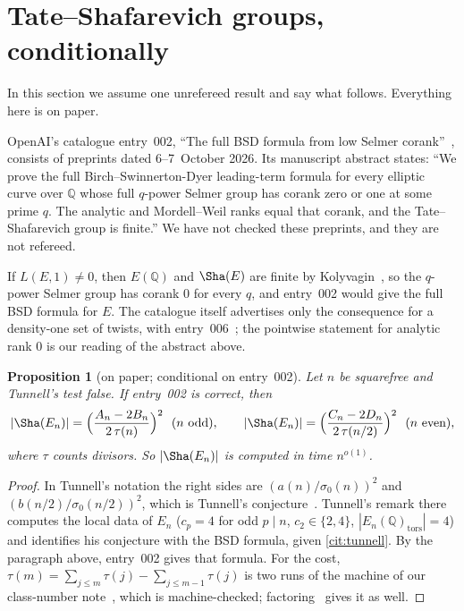 \documentclass[10pt]{amsart}
\theoremstyle{plain}
\newtheorem{proposition}[theorem]{Proposition}
\theoremstyle{definition}
\theoremstyle{remark}
\numberwithin{equation}{section}
\newcommand{\Q}{\mathbb{Q}}
\newcommand{\nr}{\dag}%
\begin{document}
\section{Tate--Shafarevich groups, conditionally}\label{sec:sha}

In this section we assume one unrefereed result and say what follows. Everything here is on paper.

OpenAI's catalogue entry~002, ``The full BSD formula from low Selmer corank''~\cite{OAI002}, consists of
preprints dated 6--7~October 2026. Its manuscript abstract states: ``We prove the full
Birch--Swinnerton-Dyer leading-term formula for every elliptic curve over $\Q$ whose full $q$-power Selmer
group has corank zero or one at some prime $q$. The analytic and Mordell--Weil ranks equal that corank, and
the Tate--Shafarevich group is finite.'' We have not checked these preprints, and they are not refereed.

If $L(E,1)\ne0$, then $E(\Q)$ and $\Sha(E)$ are finite by Kolyvagin~\cite{Kol88,Kol90}\nr, so the $q$-power
Selmer group has corank $0$ for every $q$, and entry~002 would give the full BSD formula for $E$. The
catalogue itself advertises only the consequence for a density-one set of twists, with entry~006~\cite{OAI006};
the pointwise statement for analytic rank $0$ is our reading of the abstract above.

\begin{proposition}[on paper; conditional on entry~002]\label{prop:sha}
Let $n$ be squarefree and Tunnell's test false. If entry~002 is correct, then
\[
  |\Sha(E_n)|=\Bigl(\frac{A_n-2B_n}{2\,\tau(n)}\Bigr)^2\ \ (n\text{ odd}),\qquad
  |\Sha(E_n)|=\Bigl(\frac{C_n-2D_n}{2\,\tau(n/2)}\Bigr)^2\ \ (n\text{ even}),
\]
where $\tau$ counts divisors. So $|\Sha(E_n)|$ is computed in time $n^{o(1)}$.
\end{proposition}

\begin{proof}
In Tunnell's notation the right sides are $(a(n)/\sigma_0(n))^2$ and $(b(n/2)/\sigma_0(n/2))^2$, which is
Tunnell's conjecture~\cite[p.~330]{Tun83}. Tunnell's remark there computes the local data of $E_n$
($c_p=4$ for odd $p\mid n$, $c_2\in\{2,4\}$, $|E_n(\Q)_{\mathrm{tors}}|=4$) and identifies his conjecture with
the BSD formula, given \cref{cit:tunnell}. By the paragraph above, entry~002 gives that formula. For the cost,
$\tau(m)=\sum_{j\le m}\tau(j)-\sum_{j\le m-1}\tau(j)$ is two runs of the machine  of our
class-number note~\cite{TulCN26}, which is machine-checked; factoring~\cite{Shu26,TulFac26} gives it as well.
\end{proof}
\end{document}
